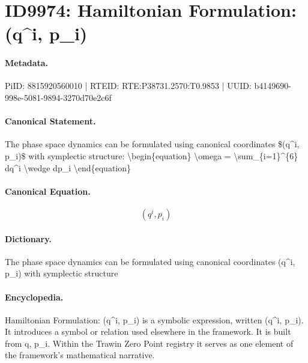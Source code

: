 \section*{ID9974: Hamiltonian Formulation: (q\textasciicircum{}i, p\_i)}
\paragraph{Metadata.}
PiID: 8815920560010 | RTEID: RTE:P38731.2570:T0.9853 | UUID: b4149690-998e-5081-9894-3270d70e2c6f

\paragraph{Canonical Statement.}
The phase space dynamics can be formulated using canonical coordinates \$(q\textasciicircum{}i, p\_i)\$ with symplectic structure: \textbackslash{}begin\{equation\} \textbackslash{}omega = \textbackslash{}sum\_\{i=1\}\textasciicircum{}\{6\} dq\textasciicircum{}i \textbackslash{}wedge dp\_i \textbackslash{}end\{equation\}

\paragraph{Canonical Equation.}
\[
(q^i, p_i)
\]

\paragraph{Dictionary.}
The phase space dynamics can be formulated using canonical coordinates (q\textasciicircum{}i, p\_i) with symplectic structure

\paragraph{Encyclopedia.}
Hamiltonian Formulation: (q\textasciicircum{}i, p\_i) is a symbolic expression, written (q\textasciicircum{}i, p\_i). It introduces a symbol or relation used elsewhere in the framework. It is built from q, p\_i. Within the Trawin Zero Point registry it serves as one element of the framework's mathematical narrative.
